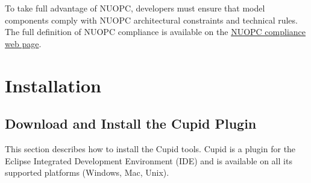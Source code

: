 \documentclass[oneside,11pt]{memoir}
\begin{document}
To take full advantage of NUOPC, developers must ensure that model components comply with NUOPC architectural constraints and technical rules. The full definition of NUOPC compliance is available on the \href{http://earthsystemcog.org/projects/nuopc/esmf2nuopc}{NUOPC compliance web page}. 


\chapter{Installation}

\section{Download and Install the Cupid Plugin}
\label{sec:installcupid}

This section describes how to install the Cupid tools. Cupid is a plugin for the Eclipse Integrated Development Environment (IDE) and is available on all its supported platforms (Windows, Mac, Unix). 
\end{document}
